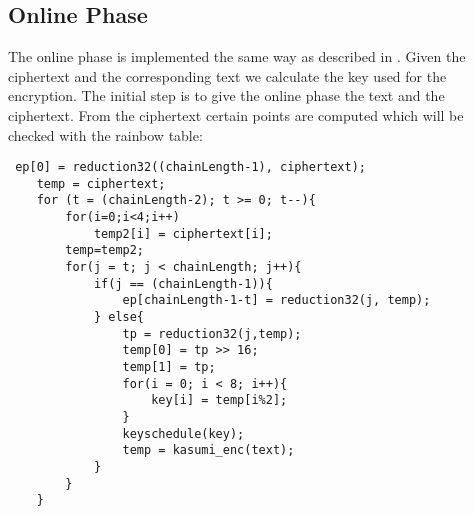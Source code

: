 \subsection{Online Phase}
The online phase is implemented the same way as described in \cite{176}. Given the ciphertext and the corresponding text we calculate the key used for the encryption. The initial step is to give the online phase the text and the ciphertext. From the ciphertext certain points are computed which will be checked with the rainbow table:
\begin{lstlisting}
 ep[0] = reduction32((chainLength-1), ciphertext);
    temp = ciphertext;
    for (t = (chainLength-2); t >= 0; t--){
        for(i=0;i<4;i++)
            temp2[i] = ciphertext[i];
        temp=temp2;
        for(j = t; j < chainLength; j++){
            if(j == (chainLength-1)){
                ep[chainLength-1-t] = reduction32(j, temp);
            } else{
                tp = reduction32(j,temp);
                temp[0] = tp >> 16;
                temp[1] = tp;
                for(i = 0; i < 8; i++){
                    key[i] = temp[i%2];
                }
                keyschedule(key);
                temp = kasumi_enc(text);
            }
        }
    }
\end{lstlisting}


